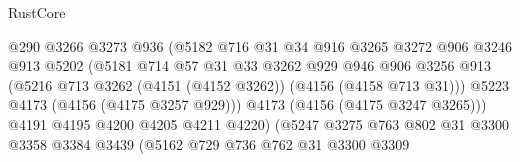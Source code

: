 \begin{lexlean}{RustCore}
\begin{coremodule}
                                    @290
                                    @3266
                                    @3273
                                    @936
                                    (@5182
                                      @716
                                      @31
                                      @34
                                      @916
                                      @3265
                                      @3272
                                      @906
                                      @3246
                                      @913
                                      @5202
                                      (@5181
                                        @714
                                        @57
                                        @31
                                        @33
                                        @3262
                                        @929
                                        @946
                                        @906
                                        @3256
                                        @913
                                        (@5216
                                          @713
                                          @3262
                                          (@4151 (@4152 @3262))
                                          (@4156 (@4158 @713 @31)))
                                        @5223
                                        @4173
                                        (@4156 (@4175 @3257 @929)))
                                      @4173
                                      (@4156 (@4175 @3247 @3265)))
                                    @4191
                                    @4195
                                    @4200
                                    @4205
                                    @4211
                                    @4220)
                                  (@5247
                                    @3275
                                    @763
                                    @802
                                    @31
                                    @3300
                                    @3358
                                    @3384
                                    @3439
                                    (@5162
                                      @729
                                      @736
                                      @762
                                      @31
                                      @3300
                                      @3309

\end{coremodule}
\end{lexlean}
